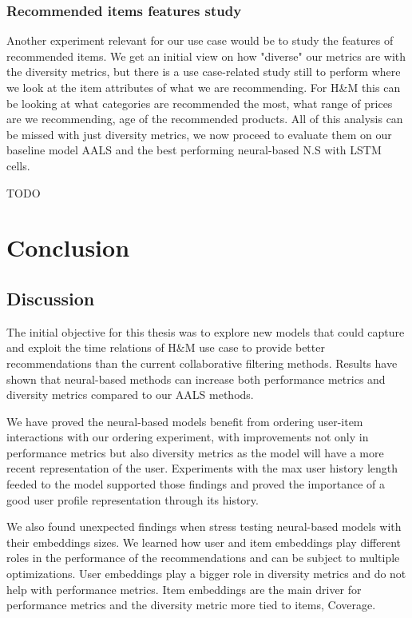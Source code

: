 \documentclass{kththesis}
\begin{document}
\subsection{Recommended items features study}
Another experiment relevant for our use case would be to study the features of recommended items. We get an initial view on how "diverse" our metrics are with the diversity metrics, but there is a use case-related study still to perform where we look at the item attributes of what we are recommending. For H\&M this can be looking at what categories are recommended the most, what range of prices are we recommending, age of the recommended products. All of this analysis can be missed with just diversity metrics, we now proceed to evaluate them on our baseline model AALS and the best performing neural-based N.S with LSTM cells.

TODO

\chapter{Conclusion}
\section{Discussion}
The initial objective for this thesis was to explore new models that could capture and exploit the time relations of H\&M use case to provide better recommendations than the current collaborative filtering methods. Results have shown that neural-based methods can increase both performance metrics and diversity metrics compared to our AALS methods.

We have proved the neural-based models benefit from ordering user-item interactions with our ordering experiment, with improvements not only in performance metrics but also diversity metrics as the model will have a more recent representation of the user. Experiments with the max user history length feeded to the model supported those findings and proved the importance of a good user profile representation through its history. 

We also found unexpected findings when stress testing neural-based models with their embeddings sizes. We learned how user and item embeddings play different roles in the performance of the recommendations and can be subject to multiple optimizations. User embeddings play a bigger role in diversity metrics and do not help with performance metrics. Item embeddings are the main driver for performance metrics and the diversity metric more tied to items, Coverage.
\end{document}
